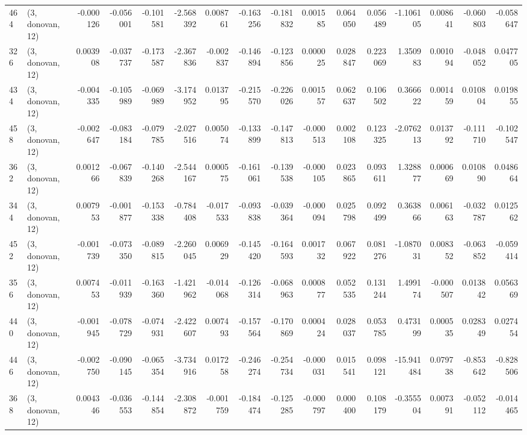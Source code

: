 \begin{tabular}{llrrrrrrrrrrrrrr}
464 &  (3, donovan, 12) &  -0.000126 & -0.056001 & -0.101581 &  -2.568392 &  0.008761 &  -0.163256 & -0.181832 &  0.001585 &  0.064050 &  0.056489 &    -1.106105 &   0.008641 &  -0.060803 &  -0.058647 \\
326 &  (3, donovan, 12) &   0.003908 & -0.037737 & -0.173587 &  -2.367836 & -0.002837 &  -0.146894 & -0.123856 &  0.000025 &  0.028847 &  0.223069 &     1.350983 &   0.001094 &  -0.048052 &   0.047705 \\
434 &  (3, donovan, 12) &  -0.004335 & -0.105989 & -0.069989 &  -3.174952 &  0.013795 &  -0.215570 & -0.226026 &  0.001557 &  0.062637 &  0.106502 &     0.366622 &   0.001459 &   0.010804 &   0.019855 \\
458 &  (3, donovan, 12) &  -0.002647 & -0.083184 & -0.079785 &  -2.027516 &  0.005074 &  -0.133899 & -0.147813 & -0.000513 &  0.002108 &  0.123325 &    -2.076213 &   0.013792 &  -0.111710 &  -0.102547 \\
362 &  (3, donovan, 12) &   0.001266 & -0.067839 & -0.140268 &  -2.544167 &  0.000575 &  -0.161061 & -0.139538 & -0.000105 &  0.023865 &  0.093611 &     1.328877 &   0.000669 &   0.010890 &   0.048664 \\
344 &  (3, donovan, 12) &   0.007953 & -0.001877 & -0.153338 &  -0.784408 & -0.017533 &  -0.093838 & -0.039364 & -0.000094 &  0.025798 &  0.092499 &     0.363866 &   0.006163 &  -0.032787 &   0.012562 \\
452 &  (3, donovan, 12) &  -0.001739 & -0.073350 & -0.089815 &  -2.260045 &  0.006929 &  -0.145420 & -0.164593 &  0.001732 &  0.067922 &  0.081276 &    -1.087031 &   0.008352 &  -0.063852 &  -0.059414 \\
356 &  (3, donovan, 12) &   0.007453 & -0.011939 & -0.163360 &  -1.421962 & -0.014068 &  -0.126314 & -0.068963 &  0.000877 &  0.052535 &  0.131244 &     1.499174 &  -0.000507 &   0.013842 &   0.056369 \\
440 &  (3, donovan, 12) &  -0.001945 & -0.078729 & -0.074931 &  -2.422607 &  0.007493 &  -0.157564 & -0.170869 &  0.000424 &  0.028037 &  0.053785 &     0.473199 &   0.000535 &   0.028349 &   0.027454 \\
446 &  (3, donovan, 12) &  -0.002750 & -0.090145 & -0.065354 &  -3.734916 &  0.017258 &  -0.246274 & -0.254734 & -0.000031 &  0.015541 &  0.098121 &   -15.941484 &   0.079738 &  -0.853642 &  -0.828506 \\
368 &  (3, donovan, 12) &   0.004346 & -0.036553 & -0.144854 &  -2.308872 & -0.001759 &  -0.184474 & -0.125285 & -0.000797 &  0.000400 &  0.108179 &    -0.355504 &   0.007391 &  -0.052112 &  -0.014465 \\

\end{tabular}
